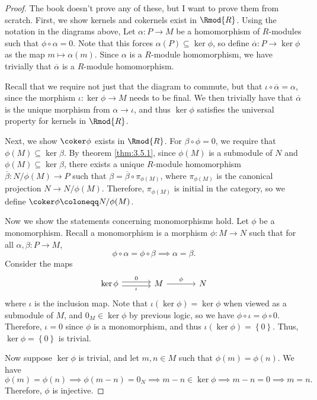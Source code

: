 \begin{proof}
	The book doesn't prove any of these, but I want to prove them from scratch. First, we show kernels and cokernels exist in $\Rmod{R} $. Using the notation in the diagrams above, Let $\alpha : P \to M$ be a homomorphism of $R$-modules such that $\phi \circ \alpha =0$. Note that this forces $\alpha (P)\subseteq \ker \phi $, so define $\overline{\alpha } : P \to \ker \phi  $ as the map  $m\mapsto \alpha (m)$. Since $\alpha $ is a $R$-module homomorphism, we have trivially that $\overline{\alpha } $ is a $R$-module homomorphism.

	Recall that we require not just that the diagram to commute, but that $\iota \circ \overline{\alpha } =\alpha $, since the morphism $\iota : \ker \phi  \to M$ needs to be final. We then trivially have that $\overline{\alpha } $ is the unique morphism from $\alpha \to \iota $, and thus $\ker \phi $ satisfies the universal property for kernels in $\Rmod{R} $.

	Next, we show $\coker \phi $ exists in $\Rmod{R}  $. For $\beta \circ \phi =0$, we require that $\phi (M)\subseteq \ker \beta $. By theorem \ref{thm:3.5.1}, since $\phi (M)$ is a submodule of $N$ and $\phi (M)\subseteq \ker \beta $, there exists a unique $R$-module homomorphism $\overline{\beta } : N /\phi (M) \to P$ such that $\beta =\overline{\beta } \circ \pi_{\phi (M)} $, where $\pi_{\phi (M)}$ is the canonical projection $N \to N /\phi (M)$. Therefore, $\pi_{\phi (M)}$ is initial in the category, so we define $\coker \phi \coloneqq  N /\phi (M)$.

	Now we show the statements concerning monomorphisms hold. Let $\phi $ be a monomorphism. Recall a monomorphism is a morphism $\phi : M \to N$ such that for all $\alpha,\beta : P \to M$,
	\[
		\phi \circ \alpha =\phi \circ \beta \implies \alpha =\beta 
	.\]
	Consider the maps
	\[\begin{tikzcd}[row sep=2.5em, column sep=3.5em]
		\ker \phi \arrow[r, shift left, "0"]\arrow[r, shift right, "\iota "']&M\arrow[r, "\phi "]&N
	\end{tikzcd}\]
	where $\iota $ is the inclusion map. Note that $\iota (\ker \phi )=\ker \phi $ when viewed as a submodule of $M$, and $0_M\in \ker \phi $ by previous logic, so we have $\phi \circ \iota =\phi \circ 0$. Therefore, $\iota =0$ since $\phi $ is a monomorphism, and thus $\iota (\ker \phi )=\left\{ 0 \right\} $. Thus, $\ker \phi =\left\{ 0 \right\} $ is trivial.

	Now suppose $\ker \phi $ is trivial, and let $m,n\in M$ such that $\phi (m)=\phi (n)$. We have
	\[
		\phi (m)=\phi (n)\implies \phi (m-n)=0_N \implies m-n\in \ker \phi \implies m-n=0 \implies m=n
	.\]
	Therefore,  $\phi $ is injective.


\end{proof}
